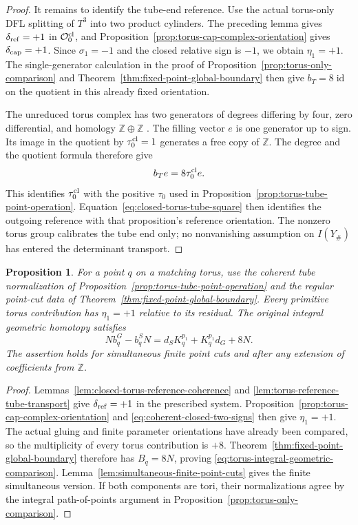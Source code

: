 \documentclass[11pt]{amsart}
\newtheorem{proposition}[theorem]{Proposition}
\theoremstyle{definition}
\theoremstyle{remark}
\theoremstyle{plain}
\newcommand{\id}{\operatorname{id}}
\begin{document}
\begin{proof}
It remains to identify the tube-end
reference. Use the actual torus-only
DFL splitting of $T^3$ into two
product cylinders. The preceding
lemma gives $\delta_{\rm ref}=+1$
in $\mathcal O_0^{\rm cl}$, and
Proposition~\ref{prop:torus-cap-complex-orientation}
gives $\delta_{\rm cap}=+1$.
Since $\sigma_1=-1$ and the closed
relative sign is $-1$, we obtain
$\eta_1=+1$. The single-generator
calculation in the proof of
Proposition~\ref{prop:torus-only-comparison}
and Theorem~\ref{thm:fixed-point-global-boundary}
then give $b_T=8\id$ on the quotient
in this already fixed orientation.

The unreduced torus complex has two
generators of degrees differing by
four, zero differential, and homology
$\mathbb Z\oplus\mathbb Z$
\cite[Section~7.1, pp.~52--53]{KronheimerMrowka10}.
The filling vector $e$ is one
generator up to sign. Its image
in the quotient by $\tau_0^{\rm cl}=1$
generates a free copy of $\mathbb Z$.
The degree and the quotient formula
therefore give
\[
                         b_Te=8\tau_0^{\rm cl}e.
\]
This identifies $\tau_0^{\rm cl}$
with the positive $\tau_0$ used in
Proposition~\ref{prop:torus-tube-point-operation}.
Equation~\eqref{eq:closed-torus-tube-square}
then identifies the outgoing
reference with that proposition's
reference orientation.
The nonzero torus group calibrates
the tube end only; no nonvanishing
assumption on $I(Y_\#)$ has entered
the determinant transport.
\end{proof}

\begin{proposition}\label{prop:torus-integral-geometric-comparison}
For a point $q$ on a matching torus, use the
coherent tube normalization of
Proposition~\ref{prop:torus-tube-point-operation}
and the regular point-cut data of
Theorem~\ref{thm:fixed-point-global-boundary}.
Every primitive torus contribution has
$\eta_1=+1$ relative to its residual.
The original integral geometric homotopy satisfies
\begin{equation}\label{eq:torus-integral-geometric-comparison}
 N b_q^G-b_q^S N
    =d_S K_q^{p_1}+K_q^{p_1}d_G+8N.
\end{equation}
The assertion holds for simultaneous finite
point cuts and after any extension of
coefficients from $\mathbb Z$.
\end{proposition}

\begin{proof}
Lemmas~\ref{lem:closed-torus-reference-coherence}
and \ref{lem:torus-reference-tube-transport}
give $\delta_{\rm ref}=+1$ in the prescribed
system. Proposition~\ref{prop:torus-cap-complex-orientation}
and \eqref{eq:coherent-closed-two-signs}
then give $\eta_1=+1$.
The actual gluing and finite parameter
orientations have already been compared,
so the multiplicity of every torus
contribution is $+8$.
Theorem~\ref{thm:fixed-point-global-boundary}
therefore has $B_q=8N$, proving
\eqref{eq:torus-integral-geometric-comparison}.
Lemma~\ref{lem:simultaneous-finite-point-cuts}
gives the finite simultaneous version.
If both components are tori, their
normalizations agree by the integral
path-of-points argument in
Proposition~\ref{prop:torus-only-comparison}.
\end{proof}
\end{document}
